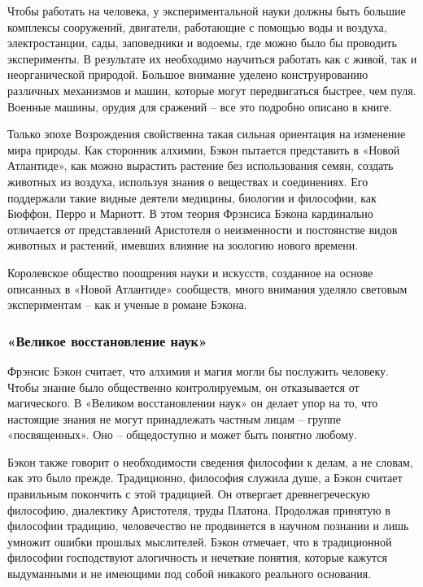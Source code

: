 \documentclass[a4paper, 14pt]{extreport}
\begin{document}
Чтобы работать на человека, у экспериментальной науки должны быть
большие комплексы сооружений, двигатели, работающие с помощью воды и
воздуха, электростанции, сады, заповедники и водоемы, где можно было бы
проводить эксперименты. В результате их необходимо научиться работать
как с живой, так и неорганической природой. Большое внимание уделено
конструированию различных механизмов и машин, которые могут
передвигаться быстрее, чем пуля. Военные машины, орудия для сражений --
все это подробно описано в книге.

Только эпохе Возрождения свойственна такая сильная ориентация на
изменение мира природы. Как сторонник алхимии, Бэкон пытается
представить в «Новой Атлантиде», как можно вырастить растение без
использования семян, создать животных из воздуха, используя знания о
веществах и соединениях. Его поддержали такие видные деятели медицины,
биологии и философии, как Бюффон, Перро и Мариотт. В этом теория
Фрэнсиса Бэкона кардинально отличается от представлений Аристотеля о
неизменности и постоянстве видов животных и растений, имевших влияние на
зоологию нового времени.

Королевское общество поощрения науки и искусств, созданное на основе
описанных в «Новой Атлантиде» сообществ, много внимания уделяло световым
экспериментам -- как и ученые в романе Бэкона.

\subsubsection{«Великое восстановление наук»}

Фрэнсис Бэкон считает, что алхимия и магия могли бы послужить человеку.
Чтобы знание было общественно контролируемым, он отказывается от
магического. В «Великом восстановлении наук» он делает упор на то, что
настоящие знания не могут принадлежать частным лицам -- группе
«посвященных». Оно -- общедоступно и может быть понятно любому.

Бэкон также говорит о необходимости сведения философии к делам, а не
словам, как это было прежде. Традиционно, философия служила душе, а
Бэкон считает правильным покончить с этой традицией. Он отвергает
древнегреческую философию, диалектику Аристотеля, труды Платона.
Продолжая принятую в философии традицию, человечество не продвинется в
научном познании и лишь умножит ошибки прошлых мыслителей. Бэкон
отмечает, что в традиционной философии господствуют алогичность и
нечеткие понятия, которые кажутся выдуманными и не имеющими под собой
никакого реального основания.
\end{document}
